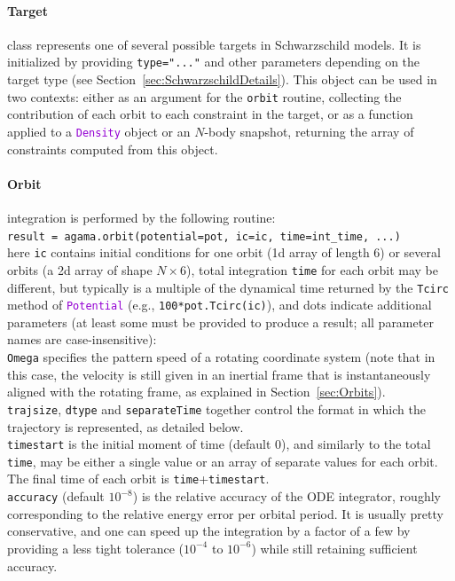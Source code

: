 \documentclass[12pt]{article}
\newcommand{\ttt}[1]{\textcolor{darkviolet}{\texttt{#1}}}
\newcommand{\ppp}[1]{\textcolor{darkolive} {\texttt{#1}}}
\let\oldparagraph\paragraph
\renewcommand{\paragraph}[1]{\vspace{-2mm}\oldparagraph{#1}}
\begin{document}
\paragraph{Target} class represents one of several possible targets in Schwarzschild models. It is initialized by providing \ppp{type="..."} and other parameters depending on the target type (see Section~\ref{sec:SchwarzschildDetails}). This object can be used in two contexts: either as an argument for the \texttt{orbit} routine, collecting the contribution of each orbit to each constraint in the target, or as a function applied to a \ttt{Density} object or an $N$-body snapshot, returning the array of constraints computed from this object.

\paragraph{Orbit} integration is performed by the following routine:\\
\texttt{result = agama.orbit(potential=pot, ic=ic, time=int_time, ...)}\\
here \ppp{ic} contains initial conditions for one orbit (1d array of length 6) or several orbits (a 2d array of shape $N\times6$), total integration \ppp{time} for each orbit may be different, but typically is a multiple of the dynamical time returned by the \texttt{Tcirc} method of \ttt{Potential} (e.g., \texttt{100*pot.Tcirc(ic)}), and dots indicate additional parameters (at least some must be provided to produce a result; all parameter names are case-insensitive):\\
\ppp{Omega} specifies the pattern speed of a rotating coordinate system (note that in this case, the velocity is still given in an inertial frame that is instantaneously aligned with the rotating frame, as explained in Section~\ref{sec:Orbits}).\\
\ppp{trajsize}, \ppp{dtype} and \ppp{separateTime} together control the format in which the trajectory is represented, as detailed below.\\
\ppp{timestart} is the initial moment of time (default 0), and similarly to the total \texttt{time}, may be either a single value or an array of separate values for each orbit. The final time of each orbit is \texttt{time}+\texttt{timestart}.\\
\ppp{accuracy} (default $10^{-8}$) is the relative accuracy of the ODE integrator, roughly corresponding to the relative energy error per orbital period. It is usually pretty conservative, and one can speed up the integration by a factor of a few by providing a less tight tolerance ($10^{-4}$ to $10^{-6}$) while still retaining sufficient accuracy.\\
\end{document}
